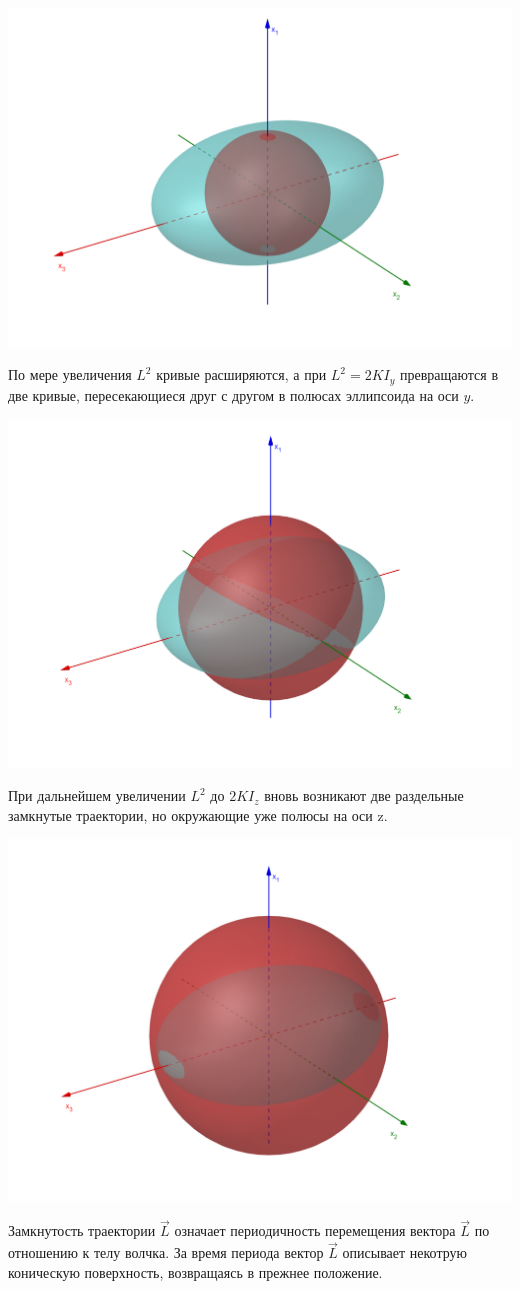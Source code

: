 \documentclass{article}
\begin{document}
\begin{center}
\includegraphics[width=0.5\linewidth]{min.png}
\end{center}

По мере увеличения $L^2$ кривые расширяются, а при $L^2 = 2KI_y$ превращаются в две кривые, пересекающиеся друг с другом в полюсах эллипсоида на оси $y$.

\begin{center}
\includegraphics[width=0.5\linewidth]{mid.png}
\end{center}

При дальнейшем увеличении $L^2$ до $2KI_z$ вновь возникают две раздельные замкнутые траектории, но окружающие уже полюсы на оси z.

\begin{center}
\includegraphics[width=0.5\linewidth]{max.png}
\end{center}

Замкнутость траектории $\vec{L}$ означает периодичность перемещения вектора $\vec{L}$ по отношению к телу волчка. За время периода вектор $\vec{L}$ описывает некотрую коническую поверхность, возвращаясь в прежнее положение. 
\end{document}
